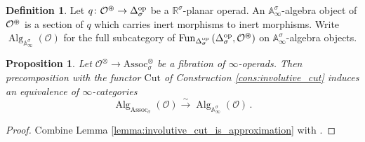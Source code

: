 \documentclass{article}
\DeclareMathOperator{\Alg}{Alg}
\DeclareMathOperator{\Fun}{Fun} %
\newcommand{\RR}{\mathbb{R}}
\renewcommand{\AA}{\mathbb{A}}
\newcommand{\op}{\mathrm{op}}
\newcommand{\Associnv}{\mathrm{Assoc}_\sigma}
\newtheorem{proposition}[theorem]{Proposition}
\theoremstyle{definition}
\newtheorem{definition}[theorem]{Definition}
\begin{document}
\begin{definition}\label{defn:inv_planar_alg}
    Let $ q \colon \mathcal{O}^\varoast \to \Delta^\op_\sigma $ be a $ \RR^\sigma $-planar operad. 
    An $ \AA^\sigma_\infty $-algebra object of $ \mathcal{O}^{\varoast} $ is a section of $ q $ which carries inert morphisms to inert morphisms. 
    Write $ \Alg_{\AA^\sigma_\infty}(\mathcal{O}) $ for the full subcategory of $ \Fun_{\Delta^\op_{\sigma}}\left(\Delta^\op_\sigma, \mathcal{O}^\varoast\right) $ on $ \AA^\sigma_\infty $-algebra objects.  
\end{definition}
\begin{proposition}
    Let $ \mathcal{O}^\otimes \to \Associnv^\otimes $ be a fibration of $ \infty $-operads. 
    Then precomposition with the functor $ \mathrm{Cut} $ of Construction \ref{cons:involutive_cut} induces an equivalence of $ \infty $-categories
    \begin{equation*}
        \Alg_{\Associnv}(\mathcal{O}) \xrightarrow{\sim} \Alg_{\AA_\infty^\sigma}\left(\mathcal{O}\right)\,.
    \end{equation*}
\end{proposition}
\begin{proof}
    Combine Lemma \ref{lemma:involutive_cut_is_approximation} with \cite[Theorem 2.3.3.23]{LurHA}. 
\end{proof}
\end{document}
